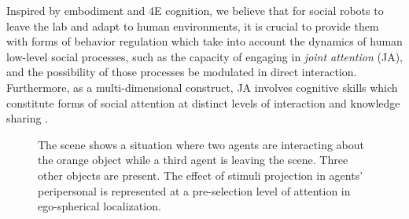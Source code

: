\documentclass[letterpaper, 10 pt, conference]{ieeeconf}  %
\begin{document}
	Inspired by embodiment and 4E cognition, we believe that for social robots to leave the lab and adapt to human environments, it is crucial to provide them with forms of behavior regulation which take into account the dynamics of human low-level social processes, such as the capacity of engaging in \textit{joint attention} (JA), and the possibility of those processes be modulated in direct interaction. Furthermore, as a multi-dimensional construct, JA involves cognitive skills which constitute forms of social attention at distinct levels of interaction and knowledge sharing \cite{siposova2019}. 
	
	\begin{figure}[h!]
		\begin{center}
			\caption{The scene shows a situation where two agents are interacting about the orange object while a third agent is leaving the scene. Three other objects are present. The effect of stimuli projection in agents’ peripersonal is represented at a pre-selection level of attention in ego-spherical localization.}
			\label{fig:multi_robots}
		\end{center}
	\end{figure}
\end{document}
